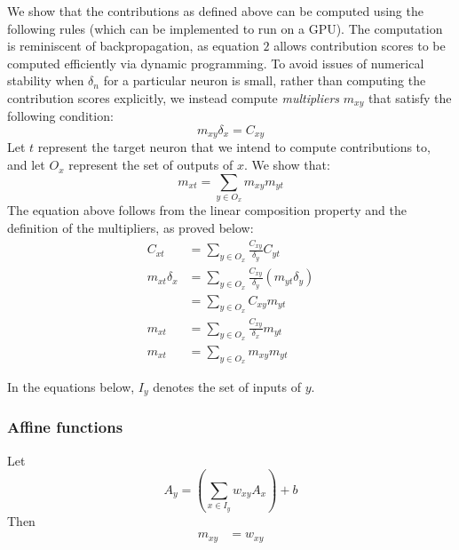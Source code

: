 \documentclass{article}
\begin{document}
We show that the contributions as defined above can be computed using the following rules (which can be implemented to run on a GPU). The computation is reminiscent of backpropagation, as equation $2$ allows contribution scores to be computed efficiently via dynamic programming. To avoid issues of numerical stability when $\delta_n$ for a particular neuron is small, rather than computing the contribution scores explicitly, we instead compute \emph{multipliers} $m_{xy}$ that satisfy the following condition:
\begin{equation}
m_{xy} \delta_x = C_{xy}
\end{equation} 
Let $t$ represent the target neuron that we intend to compute contributions to, and let $O_x$ represent the set of outputs of $x$. We show that:
\begin{equation}
m_{xt} = \sum_{y \in O_x} m_{xy}m_{yt}
\end{equation} 
The equation above follows from the linear composition property and the definition of the multipliers, as proved below:
\begin{equation}
\begin{aligned}
C_{xt} &= \sum_{y \in O_x} \frac{C_{xy}}{\delta_y}C_{yt}\\
m_{xt} \delta_x &= \sum_{y \in O_x} \frac{C_{xy}}{\delta_y}(m_{yt} \delta_y)\\
                         &= \sum_{y \in O_x} C_{xy}m_{yt}\\
m_{xt} &= \sum_{y \in O_x} \frac{C_{xy}}{\delta_x}m_{yt}\\
m_{xt} &= \sum_{y \in O_x} m_{xy} m_{yt}
\end{aligned}
\end{equation} 

In the equations below, $I_y$ denotes the set of inputs of $y$.

\subsubsection{Affine functions}
Let
\begin{equation}
A_y = \left(\sum_{x \in I_y} w_{xy} A_x\right) + b  
\end{equation}
Then
\begin{equation}
\begin{aligned}
m_{xy} &= w_{xy}
\end{aligned}
\end{equation}
\end{document}
